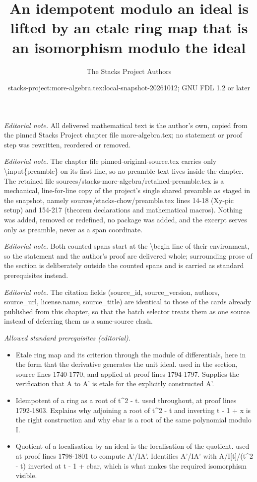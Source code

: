 \documentclass[10pt,a4paper]{amsart}
\title{An idempotent modulo an ideal is lifted by an etale ring map that is an isomorphism modulo the ideal}
\author{The Stacks Project Authors}
\date{stacks-project:more-algebra.tex:local-snapshot-20261012; GNU FDL 1.2 or later}
\theoremstyle{plain}
\theoremstyle{definition}
\theoremstyle{remark}
\numberwithin{equation}{subsection}
\begin{document}
\maketitle
\setcounter{subsection}{1}
\noindent\textit{Editorial note.} All delivered mathematical text is the author's own, copied from the pinned Stacks Project chapter file more-algebra.tex; no statement or proof step was rewritten, reordered or removed.\par\medskip
\noindent\textit{Editorial note.} The chapter file pinned-original-source.tex carries only \textbackslash{}input\{preamble\} on its first line, so no preamble text lives inside the chapter. The retained file sources/stacks-more-algebra/retained-preamble.tex is a mechanical, line-for-line copy of the project's single shared preamble as staged in the snapshot, namely sources/stacks-chow/preamble.tex lines 14-18 (Xy-pic setup) and 154-217 (theorem declarations and mathematical macros). Nothing was added, removed or redefined, no package was added, and the excerpt serves only as preamble, never as a span coordinate.\par\medskip
\noindent\textit{Editorial note.} Both counted spans start at the \textbackslash{}begin line of their environment, so the statement and the author's proof are delivered whole; surrounding prose of the section is deliberately outside the counted spans and is carried as standard prerequisites instead.\par\medskip
\noindent\textit{Editorial note.} The citation fields (source\_id, source\_version, authors, source\_url, license.name, source\_title) are identical to those of the cards already published from this chapter, so that the batch selector treats them as one source instead of deferring them as a same-source clash.\par\medskip
\noindent\textit{Allowed standard prerequisites (editorial).}\begin{itemize}
\item Etale ring map and its criterion through the module of differentials, here in the form that the derivative generates the unit ideal. used in the section, source lines 1740-1770, and applied at proof lines 1794-1797. Supplies the verification that A to A' is etale for the explicitly constructed A'.
\item Idempotent of a ring as a root of t\textasciicircum{}2 - t. used throughout, at proof lines 1792-1803. Explains why adjoining a root of t\textasciicircum{}2 - t and inverting t - 1 + x is the right construction and why ebar is a root of the same polynomial modulo I.
\item Quotient of a localisation by an ideal is the localisation of the quotient. used at proof lines 1798-1801 to compute A'/IA'. Identifies A'/IA' with A/I[t]/(t\textasciicircum{}2 - t) inverted at t - 1 + ebar, which is what makes the required isomorphism visible.
\end{itemize}\medskip
\end{document}
